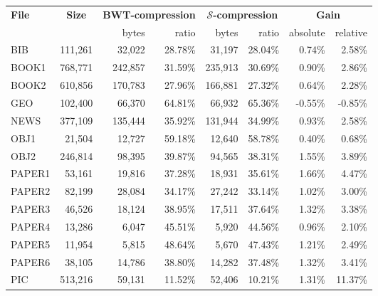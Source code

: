 \documentclass[a4paper,12pt]{article}
\newcommand{\alg}[1]{{\textup{\textsf{#1}}}}
\newcommand{\Acronym}{\ensuremath{\mathcal{S}}}
\newcommand{\BWT}{\alg{BWT}}
\numberwithin{algorithm}{section}
\begin{document}
\begin{table}[hbt]
\begin{center}
\begin{tabular}{| l | r | r r| r r| r r|}
\hline
\textbf{File} &  \multicolumn{1}{|c|}{\textbf{Size}}
                  & \multicolumn{2}{|c|}{\textbf{\BWT-compression}}
                  &   \multicolumn{2}{|c|}{\textbf{\Acronym-compression}}
                  &  \multicolumn{2}{|c|}{\textbf{Gain}} \\
 & & \small{bytes}  & \small{ratio} &  \small{bytes} & \small{ratio}& \small{absolute} & \small{relative} \\
\hline
\textsc{BIB}   &   111,261 &   32,022  &   28.78\%  &   31,197  &   28.04\%  &   0.74\%  & 2.58\%   \\
\textsc{BOOK1}   &   768,771 &   242,857 &   31.59\%  &   235,913 &   30.69\%  &   0.90\%  &  2.86\%   \\
\textsc{BOOK2}   &   610,856 &   170,783 &   27.96\%  &   166,881 &   27.32\%  &   0.64\% &  2.28\%   \\
\textsc{GEO}   &   102,400 &   66,370  &   64.81\%  &   66,932  &   65.36\%  &   -0.55\% &  -0.85\%  \\
\textsc{NEWS}   &   377,109 &   135,444 &   35.92\%  &   131,944 &   34.99\%  &   0.93\% &  2.58\%   \\
\textsc{OBJ1}   &   21,504  &   12,727  &   59.18\%  &   12,640  &   58.78\%  &   0.40\% &  0.68\%   \\
\textsc{OBJ2}   &   246,814 &   98,395  &   39.87\%  &   94,565  &   38.31\%  &   1.55\%  &3.89\%   \\
\textsc{PAPER1}   &   53,161  &   19,816  &   37.28\%  &   18,931  &   35.61\%  &   1.66\%  & 4.47\%   \\
\textsc{PAPER2}   &   82,199  &   28,084  &   34.17\%  &   27,242  &   33.14\%  &   1.02\% &  3.00\%   \\
\textsc{PAPER3}   &   46,526  &   18,124  &   38.95\%  &   17,511  &   37.64\%  &   1.32\% &  3.38\%   \\
\textsc{PAPER4}   &   13,286  &   6,047   &   45.51\%  &   5,920   &   44.56\%  &   0.96\% &  2.10\%   \\
\textsc{PAPER5}   &   11,954  &   5,815   &   48.64\%  &   5,670   &   47.43\%  &   1.21\%  & 2.49\%   \\
\textsc{PAPER6}   &   38,105  &   14,786  &   38.80\%  &   14,282  &   37.48\%  &   1.32\%  & 3.41\%   \\
\textsc{PIC}   &   513,216 &   59,131  &   11.52\%  &   52,406  &   10.21\%  &   1.31\%   &11.37\%  \\

\end{tabular}
\end{center}
\end{table}
\end{document}
